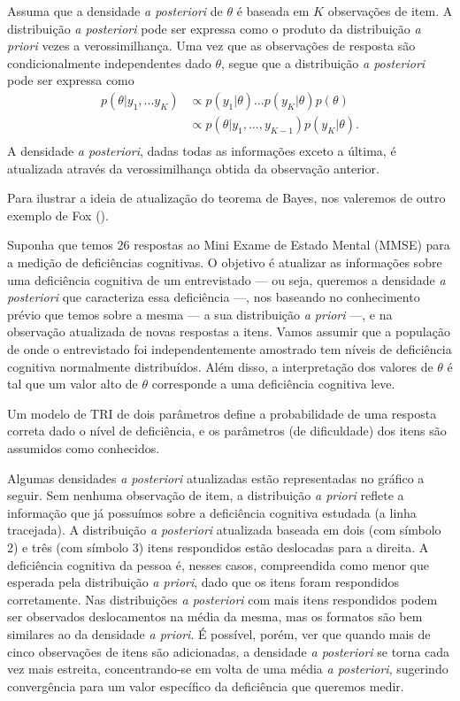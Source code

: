 \documentclass[
	12pt,				%
	openright,			%
	twoside,			%
	a4paper,			%
	english,			%
	brazil				%
	]{abntex2}
\begin{document}
 Assuma que a densidade \emph{a posteriori} de $\theta$ é baseada em $K$ observações de item. A distribuição \emph{a posteriori} pode ser expressa como o produto da distribuição \emph{a priori} vezes a verossimilhança. Uma vez que as observações de resposta são condicionalmente independentes dado $\theta$, segue que a distribuição \emph{a posteriori} pode ser expressa como
 \begin{equation}
    \begin{aligned}
        p(\theta|y_{1}, ... y_{K}) &\propto p(y_{1}|\theta) ... p(y_{K}|\theta) p(\theta) \\
        & \propto p(\theta|y_{1}, ..., y_{K-1}) p(y_{K}|\theta). \\
     \end{aligned}
 \end{equation}
 A densidade \emph{a posteriori}, dadas todas as informações exceto a última, é atualizada através da verossimilhança obtida da observação anterior.

 Para ilustrar a ideia de atualização do teorema de Bayes, nos valeremos de outro exemplo de Fox (\citeyear{fox2010}).
 
 Suponha que temos 26 respostas ao Mini Exame de Estado Mental (MMSE) para a medição de deficiências cognitivas. O objetivo é atualizar as informações sobre uma deficiência cognitiva de um entrevistado --- ou seja, queremos a densidade \emph{a posteriori} que caracteriza essa deficiência ---, nos baseando no conhecimento prévio que temos sobre a mesma --- a sua distribuição \emph{a priori} ---, e na observação atualizada de novas respostas a itens. Vamos assumir que a população de onde o entrevistado foi independentemente amostrado tem níveis de deficiência cognitiva normalmente distribuídos. Além disso, a interpretação dos valores de $\theta$ é tal que um valor alto de $\theta$ corresponde a uma deficiência cognitiva leve.
 
 Um modelo de TRI de dois parâmetros define a probabilidade de uma resposta correta dado o nível de deficiência, e os parâmetros (de dificuldade) dos itens são assumidos como conhecidos.

 Algumas densidades \emph{a posteriori} atualizadas estão representadas no gráfico a seguir. Sem nenhuma observação de item, a distribuição \emph{a priori} reflete a informação que já possuímos sobre a deficiência cognitiva estudada (a linha tracejada). A distribuição \emph{a posteriori} atualizada baseada em dois (com símbolo 2) e três (com símbolo 3) itens respondidos estão deslocadas para a direita. A deficiência cognitiva da pessoa é, nesses casos, compreendida como menor que esperada pela distribuição \emph{a priori}, dado que os itens foram respondidos corretamente. Nas distribuições \emph{a posteriori} com mais itens respondidos podem ser observados deslocamentos na média da mesma, mas os formatos são bem similares ao da densidade \emph{a priori}. É possível, porém, ver que quando mais de cinco observações de itens são adicionadas, a densidade \emph{a posteriori} se torna cada vez mais estreita, concentrando-se em volta de uma média \emph{a posteriori}, sugerindo convergência para um valor específico da deficiência que queremos medir.
 
\end{document}
